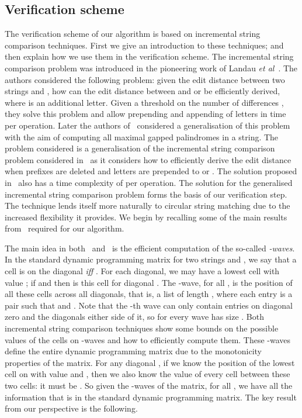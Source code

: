\documentclass[runningheads, envcountsame, a4paper]{llncs}\usepackage{etex}
\begin{document}
\subsection{Verification scheme}

The verification scheme of our algorithm is based on incremental string comparison techniques. 
First we give an introduction to these techniques; and then explain how we use them in the verification scheme.
The incremental string comparison problem was introduced in the pioneering work of Landau {\em et al}~\cite{LMS98}. 
The authors considered the following problem: given the edit distance between two strings  and , 
how can the edit distance between  and  or  be efficiently derived, where  is an additional letter. 
Given a threshold on the number of differences , they solve this problem and allow prepending and appending of letters in time  per operation. 
Later the authors of~\cite{Hsu:2009:FAG:1696924.1697033} considered a generalisation of this problem with the aim of computing all maximal gapped palindromes in a string. 
The problem considered is a generalisation of the incremental string comparison problem considered in~\cite{LMS98} as it considers how to efficiently derive the edit distance when prefixes are deleted and letters are prepended to  or . The solution proposed in~\cite{Hsu:2009:FAG:1696924.1697033} also has a 
time complexity of  per operation. 
The solution for the generalised incremental string comparison problem forms the basis of our verification step. The technique lends itself more naturally to circular string matching due to the increased flexibility it provides. We begin by recalling some of the main results from~\cite{Hsu:2009:FAG:1696924.1697033} required for our algorithm.

The main idea in both~\cite{LMS98} and~\cite{Hsu:2009:FAG:1696924.1697033} is the efficient computation of the so-called \textit{-waves}. 
In the standard dynamic programming matrix for two strings  and , we say that a cell  is on the diagonal  {\em iff} . For each diagonal, we may have a lowest cell with value ; if  and  then  is this cell for diagonal . The -wave, for all , is the position of all these cells across all diagonals, that is, a list  of length , where each entry is a pair  such that  and . Note that the -th wave can only contain entries on diagonal zero and the  diagonals either side of it, so for  every wave has size . 
Both incremental string comparison techniques show some bounds on the possible values of the cells on -waves and how to 
efficiently compute them. 
These -waves define the entire dynamic programming matrix due to the monotonicity properties of the matrix. For any diagonal , if we know the position of the lowest cell on  with 
value  and , then we also know the value of every cell between these two cells: it must be . So given the -waves of the matrix, for all , we have all the information that is in the standard dynamic programming matrix. The key result from our perspective is the following.
\end{document}
